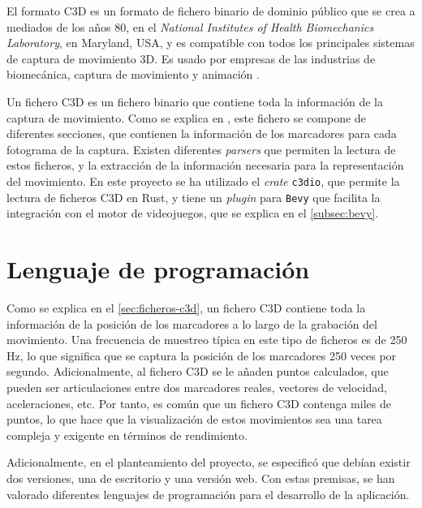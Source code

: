 El formato C3D es un formato de fichero binario de dominio público que se crea a mediados de los años 80, en el \textit{National Institutes of Health Biomechanics Laboratory}, en Maryland, USA, y es compatible con todos los principales sistemas de captura de movimiento 3D. Es usado por empresas de las industrias de biomecánica, captura de movimiento y animación \autocite{C3DORGBiomechanicsStandard}.

Un fichero C3D es un fichero binario que contiene toda la información de la captura de movimiento. Como se explica en \autocite{C3DORGBiomechanicsStandard}, este fichero se compone de diferentes secciones, que contienen la información de los marcadores para cada fotograma de la captura. Existen diferentes \textit{parsers} que permiten la lectura de estos ficheros, y la extracción de la información necesaria para la representación del movimiento. En este proyecto se ha utilizado el \textit{crate} \texttt{c3dio}, que permite la lectura de ficheros C3D en Rust, y tiene un \textit{plugin} para \texttt{Bevy} que facilita la integración con el motor de videojuegos, que se explica en el \autoref{subsec:bevy}.

\section{Lenguaje de programación}

\noindent Como se explica en el \autoref{sec:ficheros-c3d}, un fichero C3D contiene toda la información de la posición de los marcadores a lo largo de la grabación del movimiento. Una frecuencia de muestreo típica en este tipo de ficheros es de 250 Hz, lo que significa que se captura la posición de los marcadores 250 veces por segundo. Adicionalmente, al fichero C3D se le añaden puntos calculados, que pueden ser articulaciones entre dos marcadores reales, vectores de velocidad, aceleraciones, etc. Por tanto, es común que un fichero C3D contenga miles de puntos, lo que hace que la visualización de estos movimientos sea una tarea compleja y exigente en términos de rendimiento.  

Adicionalmente, en el planteamiento del proyecto, se especificó que debían existir dos versiones, una de escritorio y una versión web. Con estas premisas, se han valorado diferentes lenguajes de programación para el desarrollo de la aplicación.  

